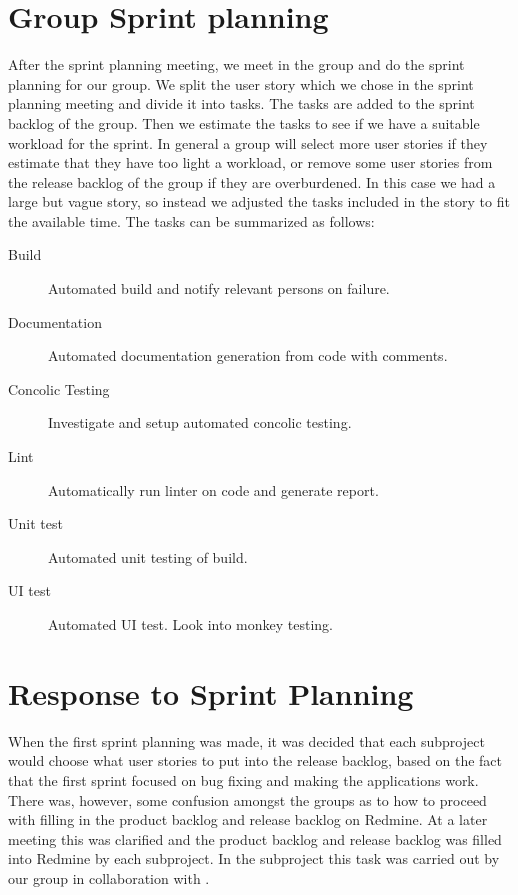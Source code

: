 \section{Group Sprint planning}
After the \bd sprint planning meeting, we meet in the group and do the sprint planning for our group. We split the user story which we chose in the \bd sprint planning meeting and divide it into tasks. The tasks are added to the sprint backlog of the group. Then we estimate the tasks to see if we have a suitable workload for the sprint. In general a group will select more user stories if they estimate that they have too light a workload, or remove some user stories from the release backlog of the group if they are overburdened. In this case we had a large but vague story, so instead we adjusted the tasks included in the story to fit the available time. The tasks can be summarized as follows:

\begin{description}
    \item[Build] Automated build and notify relevant persons on failure.
    \item[Documentation] Automated documentation generation from code with comments.
    \item[Concolic Testing] Investigate and setup automated concolic testing.
    \item[Lint] Automatically run linter on code and generate report.
    \item[Unit test] Automated unit testing of build.
    \item[UI test] Automated UI test. Look into monkey testing. 
\end{description}

\section{Response to Sprint Planning}
When the first sprint planning was made, it was decided that each subproject would choose what user stories to put into the release backlog, based on the fact that the first sprint focused on bug fixing and making the applications work. There was, however, some confusion amongst the groups as to how to proceed with filling in the product backlog and release backlog on Redmine. At a later meeting this was clarified and the product backlog and release backlog was filled into Redmine by each subproject. In the \bd subproject this task was carried out by our group in collaboration with .

